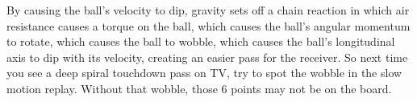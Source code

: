 \documentclass{article}
\begin{document}
By causing the ball's velocity to dip, gravity sets off a chain reaction in which air resistance causes a torque on the ball, which causes the ball's angular momentum to rotate, which causes the ball to wobble, which causes the ball's longitudinal axis to dip with its velocity, creating an easier pass for the receiver. So next time you see a deep spiral touchdown pass on TV, try to spot the wobble in the slow motion replay. Without that wobble, those 6 points may not be on the board.

\nocite{*}
\printbibliography
\end{document}
